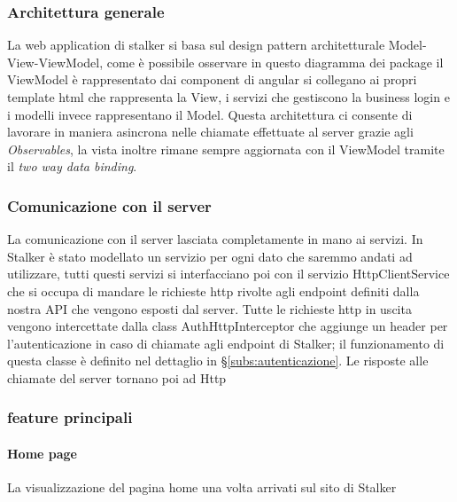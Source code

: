 \documentclass[../../manuale-sviluppatore.tex]{subfiles}
\begin{document}
\subsubsection{Architettura generale}%
\label{subs:architettura_generale}


La web application di stalker si basa sul design pattern architetturale Model-View-ViewModel, come è possibile osservare in questo diagramma dei package il ViewModel è rappresentato dai component di angular si collegano ai propri template html che rappresenta la View, i servizi che gestiscono la business login e i modelli invece rappresentano il Model.
Questa architettura ci consente di lavorare in maniera asincrona nelle chiamate effettuate al server grazie agli \textit{Observables}, la vista inoltre rimane sempre aggiornata con il ViewModel tramite il \textit{two way data binding}.

\subsubsection{Comunicazione con il server}%
\label{subs:comunicazione_server}

La comunicazione con il server lasciata completamente in mano ai servizi.
In Stalker è stato modellato un servizio per ogni dato che saremmo andati ad utilizzare, tutti questi servizi si interfacciano poi con il servizio HttpClientService che si occupa di mandare le richieste http rivolte agli endpoint definiti dalla nostra API che vengono esposti dal server.
Tutte le richieste http in uscita vengono intercettate dalla class AuthHttpInterceptor che aggiunge un header per l'autenticazione in caso di chiamate agli endpoint di Stalker; il funzionamento di questa classe è definito nel dettaglio in §\ref{subs:autenticazione}.
Le risposte alle chiamate del server tornano poi ad Http


\subsubsection{feature principali}%
\label{subs:feature_principali}

\paragraph{Home page}%
\label{par:home_page}
La visualizzazione del pagina home una volta arrivati sul sito di Stalker

\end{document}
